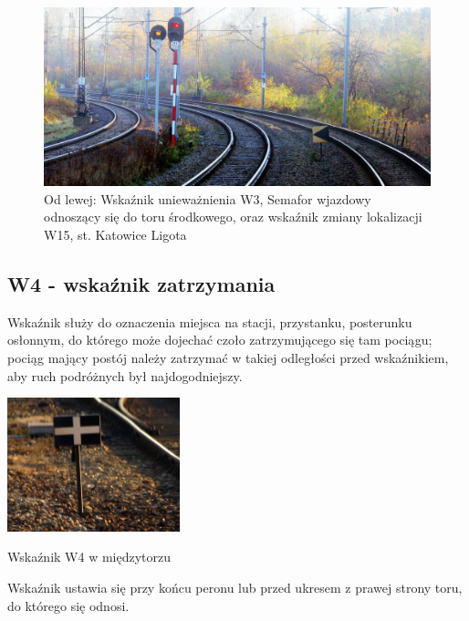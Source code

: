 	\begin{figure}
		\includegraphics[width=14cm]{skryptkierownik-img/skryptkierownik-img005.jpg}
		\caption{Od lewej: Wskaźnik unieważnienia W3, Semafor wjazdowy odnoszący się do toru środkowego, oraz wskaźnik zmiany lokalizacji W15, st. Katowice Ligota}
	\end{figure}

\subsection{W4 - wskaźnik zatrzymania}

\begin{tcolorbox}[colback=black!5!white,colframe=white!55!black,title=Wskaźnik W4]Wskaźnik służy do oznaczenia miejsca na stacji, przystanku, posterunku osłonnym, do którego może dojechać czoło zatrzymującego się tam pociągu; pociąg mający postój należy zatrzymać w takiej odległości przed wskaźnikiem, aby ruch podróżnych był najdogodniejszy.
\end{tcolorbox}
	
\begin{marginfigure}
	\includegraphics[width=5cm]{skryptkierownik-img/skryptkierownik-img006.jpg}
	\caption{Wskaźnik W4 w międzytorzu}
\end{marginfigure} 
Wskaźnik ustawia się przy końcu peronu lub przed ukresem z prawej strony toru, do którego się odnosi.

